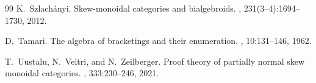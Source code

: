 \documentclass[11pt,a4paper]{article}
\theoremstyle{definition}
\theoremstyle{remark}
\begin{document}
\begin{thebibliography}{99}
K.~Szlach\'{a}nyi.
\newblock Skew-monoidal categories and bialgebroids.
, 231(3--4):1694--1730, 2012.

D.~Tamari.
\newblock The algebra of bracketings and their enumeration.
, 10:131--146, 1962.

T.~Uustalu, N.~Veltri, and N.~Zeilberger.
\newblock Proof theory of partially normal skew monoidal categories.
, 333:230--246, 2021.

\end{thebibliography}
\end{document}
